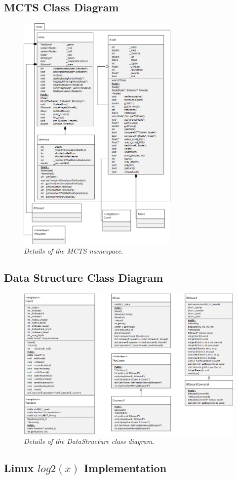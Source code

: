 \subsection{MCTS Class Diagram}
\begin{figure}[H] 
\centerline{\includegraphics[width=0.7\textwidth]{Annexes/Img/MCTS.png}}
\caption{\label{fig:mctsclassdiagram}\textit{Details of the MCTS namespace}.}
\end{figure}

\subsection{Data Structure Class Diagram}
\begin{figure}[H] 
\centerline{\includegraphics[width=\textwidth]{Annexes/Img/DataStructure.png}}
\caption{\label{fig:datastructuredetails}\textit{Details of the DataStructure class diagram}.}
\end{figure}

\subsection{Linux \ensuremath{log2(x)} Implementation} \label{subsec:fastLog}

